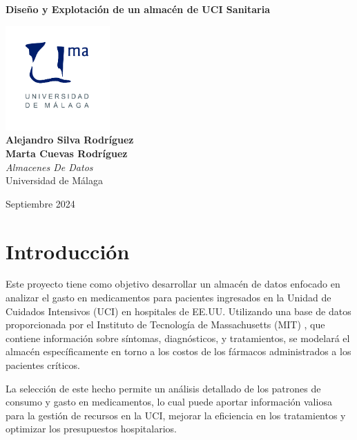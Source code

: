 \documentclass{article}
\begin{document}
\begin{titlepage}
	\centering
	\vspace*{3cm}
	
	{\Huge \textbf{Diseño y Explotación de un almacén de 
			UCI Sanitaria}\\[0.5cm]}
	
	\vspace{2cm}
	\includegraphics[width=0.3\textwidth]{images/uma_logo.jpg}\\[1cm]
	
	{\LARGE \textbf{Alejandro Silva Rodríguez}\\[0.5cm]}
	{\LARGE \textbf{Marta Cuevas Rodríguez}\\[0.5cm]}
	{\large \textit{Almacenes De Datos}\\
		Universidad de Málaga\\
		}
	
	\vfill
	
	{\large Septiembre 2024}
\end{titlepage}

\tableofcontents

\newpage
\section{Introducción}
\label{sec:introduccion}
Este proyecto tiene como objetivo desarrollar un almacén de datos enfocado en analizar el gasto en medicamentos para pacientes ingresados en la Unidad de Cuidados Intensivos (UCI) en hospitales de EE.UU. Utilizando una base de datos proporcionada por el Instituto de Tecnología de Massachusetts (MIT) \cite{eicu_crd}, que contiene información sobre síntomas, diagnósticos, y tratamientos, se modelará el almacén específicamente en torno a los costos de los fármacos administrados a los pacientes críticos.

La selección de este hecho permite un análisis detallado de los patrones de consumo y gasto en medicamentos, lo cual puede aportar información valiosa para la gestión de recursos en la UCI, mejorar la eficiencia en los tratamientos y optimizar los presupuestos hospitalarios.
\end{document}
